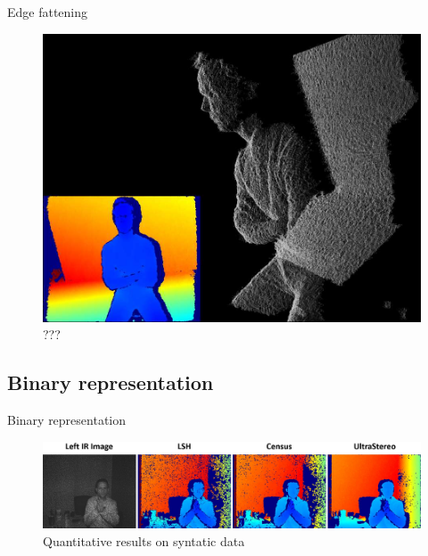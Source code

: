 \documentclass{beamer}
\begin{document}
\begin{frame}{Edge fattening}
\begin{figure}
\includegraphics[scale=0.15]{pictures/fig6}
\caption{???}
\end{figure}
\end{frame}

\subsection{Binary representation}
\begin{frame}{Binary representation}
\begin{figure}
\includegraphics[scale=0.1]{pictures/fig7}
\caption{Quantitative results on syntatic data}
\end{figure}
\end{frame}
\end{document}
